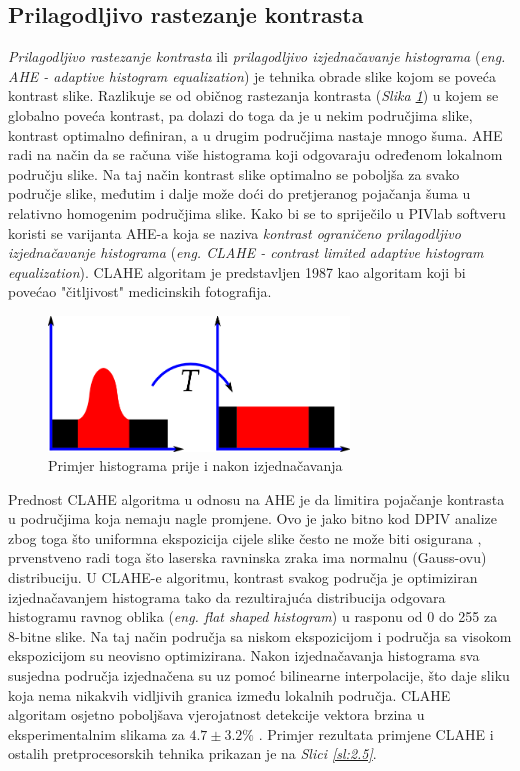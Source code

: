 \subsection{Prilagodljivo rastezanje kontrasta}
\textit{Prilagodljivo rastezanje kontrasta} \cite{wiki:Adaptive_histogram_equalization} ili \textit{prilagodljivo izjednačavanje histograma} (\textit{eng. AHE - adaptive histogram equalization}) je tehnika obrade slike kojom se poveća kontrast slike. Razlikuje se od običnog rastezanja kontrasta (\textit{Slika \ref{sl:2.4}}) u kojem se globalno poveća kontrast, pa dolazi do toga da je u nekim područjima slike, kontrast optimalno definiran, a u drugim područjima nastaje mnogo šuma. AHE radi na način da se računa više histograma koji odgovaraju određenom lokalnom području slike. Na taj način kontrast slike optimalno se poboljša za svako područje slike, međutim i dalje može doći do pretjeranog pojačanja šuma u relativno homogenim područjima slike. Kako bi se to spriječilo u PIVlab softveru koristi se varijanta AHE-a koja se naziva \textit{kontrast ograničeno prilagodljivo izjednačavanje histograma} (\textit{eng. CLAHE - contrast limited adaptive histogram equalization}). CLAHE algoritam je predstavljen 1987 kao algoritam koji bi povećao "čitljivost" medicinskih fotografija.
\begin{figure}[h]  
	\centering
	\includegraphics[width=8cm]{./2_DPIV/2_4Histogram.jpg} 
	\caption{Primjer histograma prije i nakon izjednačavanja \cite{wiki:Histogram_equalization}}
	\label{sl:2.4}
\end{figure}
\par
Prednost CLAHE algoritma u odnosu na AHE je da limitira pojačanje kontrasta u područjima koja nemaju nagle promjene. Ovo je jako bitno kod DPIV analize zbog toga što uniformna ekspozicija cijele slike često ne može biti osigurana \cite{adrian2011_book}, prvenstveno radi toga što laserska ravninska zraka ima normalnu (Gauss-ovu) distribuciju. U CLAHE-e algoritmu, kontrast svakog područja je optimiziran izjednačavanjem histograma tako da rezultirajuća distribucija odgovara histogramu ravnog oblika (\textit{eng. flat shaped histogram}) u rasponu od 0 do 255 za 8-bitne slike. Na taj način područja sa niskom ekspozicijom i područja sa visokom ekspozicijom su neovisno optimizirana. Nakon izjednačavanja histograma sva susjedna područja izjednačena su uz pomoć bilinearne interpolacije, što daje sliku koja nema nikakvih vidljivih granica između lokalnih područja. CLAHE algoritam osjetno poboljšava vjerojatnost detekcije vektora brzina u eksperimentalnim slikama za $4.7 \pm 3.2\%$ \cite{thielicke2014_phd}. Primjer rezultata primjene CLAHE i ostalih pretprocesorskih tehnika prikazan je na \textit{Slici \ref{sl:2.5}}.
\FloatBarrier
